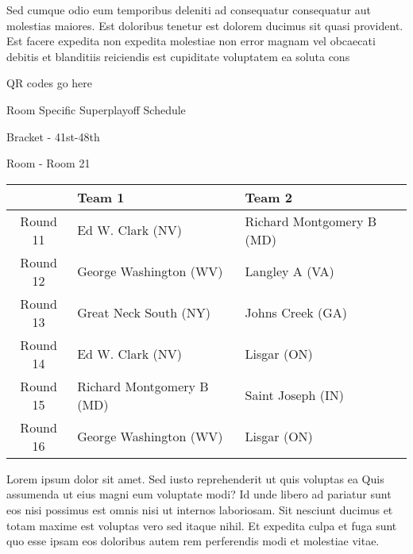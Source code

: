 \documentclass{article}%
\begin{document}
\newline%
    Sed cumque odio eum temporibus deleniti ad consequatur consequatur aut molestias maiores. Est doloribus tenetur est dolorem ducimus sit quasi provident. Est facere expedita non expedita molestiae non error magnam vel obcaecati debitis et blanditiis reiciendis est cupiditate voluptatem ea soluta cons%
\vspace*{140pt}%
\begin{center}%
\begin{Huge}%
QR codes go here%
\end{Huge}%
\end{center}%
\newpage%
\begin{center}%
\begin{Huge}%
Room Specific Superplayoff Schedule%
\end{Huge}%
\vspace*{8pt}%
\linebreak%
\begin{Large}%
Bracket {-} 41st{-}48th%
\end{Large}%
\vspace*{8pt}%
\linebreak%
\vspace*{8pt}%
\begin{Large}%
Room {-} Room 21%
\end{Large}%
\end{center}%
%
\begin{tabularx}{\textwidth}{|c|Y|Y|}%
\hline%
&Team 1&Team 2\\%
\hline%
Round 11&Ed W. Clark (NV)&Richard Montgomery B (MD)\\%
Round 12&George Washington (WV)&Langley A (VA)\\%
Round 13&Great Neck South (NY)&Johns Creek (GA)\\%
Round 14&Ed W. Clark (NV)&Lisgar (ON)\\%
Round 15&Richard Montgomery B (MD)&Saint Joseph (IN)\\%
Round 16&George Washington (WV)&Lisgar (ON)\\%
\hline%
\end{tabularx}%
\vspace*{8pt}%
\newline%
    Lorem ipsum dolor sit amet. Sed iusto reprehenderit ut quis voluptas ea Quis assumenda ut eius magni eum voluptate modi? Id unde libero ad pariatur sunt eos nisi possimus est omnis nisi ut internos laboriosam. Sit nesciunt ducimus et totam maxime est voluptas vero sed itaque nihil. Et expedita culpa et fuga sunt quo esse ipsam eos doloribus autem rem perferendis modi et molestiae vitae.\newline%
\end{document}
